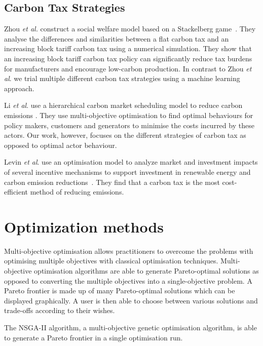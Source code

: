\documentclass[sigconf]{acmart}
\begin{document}
\subsection{Carbon Tax Strategies}


Zhou \textit{et al.} construct a social welfare model based on a Stackelberg game~\cite{Zhou2019}. They analyse the differences and similarities between a flat carbon tax and an increasing block tariff carbon tax using a numerical simulation. They show that an increasing block tariff carbon tax policy can significantly reduce tax burdens for manufacturers and encourage low-carbon production. In contrast to Zhou \textit{et al}. we trial multiple different carbon tax strategies using a machine learning approach. 

Li \textit{et al}. use a hierarchical carbon market scheduling model to reduce carbon emissions \cite{Li2017}. They use multi-objective optimisation to find optimal behaviours for policy makers, customers and generators to minimise the costs incurred by these actors. Our work, however, focuses on the different strategies of carbon tax as opposed to optimal actor behaviour.

Levin \textit{et al}. use an optimisation model to analyze market and investment impacts of several incentive mechanisms to support investment in renewable energy and carbon emission reductions~\cite{Levin2019}. They find that a carbon tax is the most cost-efficient method of reducing emissions.


\section{Optimization methods}
\label{sec:optimization_methods}

Multi-objective optimisation allows practitioners to overcome the problems with optimising multiple objectives with classical optimisation techniques. Multi-objective optimisation algorithms are able to generate Pareto-optimal solutions as opposed to converting the multiple objectives into a single-objective problem. A Pareto frontier is made up of many Pareto-optimal solutions which can be displayed graphically. A user is then able to choose between various solutions and trade-offs according to their wishes.

The NSGA-II algorithm, a multi-objective genetic optimisation algorithm, is able to generate a Pareto frontier in a single optimisation run. 
\end{document}
